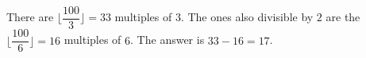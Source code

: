 There are $\lfloor\dfrac{100}{3}\rfloor=33$ multiples of $3$. The ones also divisible by $2$ are the $\lfloor\dfrac{100}{6}\rfloor=16$ multiples of $6$. The answer is $33-16=\boxed{17}$.
